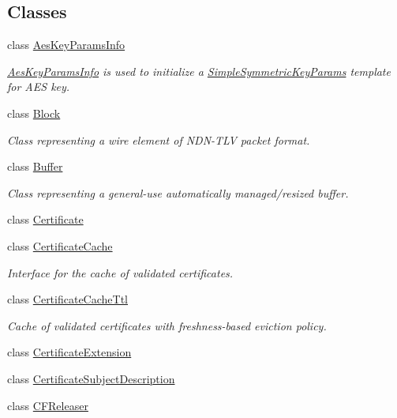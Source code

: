 \subsection*{Classes}
\begin{DoxyCompactItemize}
\item 
class \hyperlink{classndn_1_1AesKeyParamsInfo}{Aes\+Key\+Params\+Info}
\begin{DoxyCompactList}\small\item\em \hyperlink{classndn_1_1AesKeyParamsInfo}{Aes\+Key\+Params\+Info} is used to initialize a \hyperlink{classndn_1_1SimpleSymmetricKeyParams}{Simple\+Symmetric\+Key\+Params} template for A\+ES key. \end{DoxyCompactList}\item 
class \hyperlink{classndn_1_1Block}{Block}
\begin{DoxyCompactList}\small\item\em Class representing a wire element of N\+D\+N-\/\+T\+LV packet format. \end{DoxyCompactList}\item 
class \hyperlink{classndn_1_1Buffer}{Buffer}
\begin{DoxyCompactList}\small\item\em Class representing a general-\/use automatically managed/resized buffer. \end{DoxyCompactList}\item 
class \hyperlink{classndn_1_1Certificate}{Certificate}
\item 
class \hyperlink{classndn_1_1CertificateCache}{Certificate\+Cache}
\begin{DoxyCompactList}\small\item\em Interface for the cache of validated certificates. \end{DoxyCompactList}\item 
class \hyperlink{classndn_1_1CertificateCacheTtl}{Certificate\+Cache\+Ttl}
\begin{DoxyCompactList}\small\item\em Cache of validated certificates with freshness-\/based eviction policy. \end{DoxyCompactList}\item 
class \hyperlink{classndn_1_1CertificateExtension}{Certificate\+Extension}
\item 
class \hyperlink{classndn_1_1CertificateSubjectDescription}{Certificate\+Subject\+Description}
\item 
class \hyperlink{classndn_1_1CFReleaser}{C\+F\+Releaser}

\end{DoxyCompactItemize}

